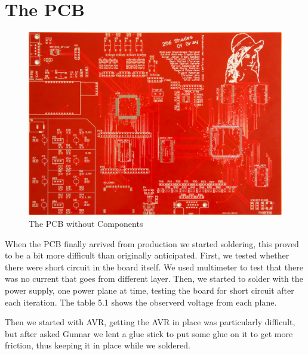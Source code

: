 \section {The PCB}
\begin{figure}[h]
  \centering
  \includegraphics[width=\textwidth]{fig/pcb/pcbwithoutcomp}
  \caption{The PCB without Components}
  \label{fig:pcb}
\end{figure}
When the PCB finally arrived from production we started soldering, this proved to be a bit
more difficult than originally anticipated. First, we tested whether there were short circuit in the board itself. We used multimeter to test that there was no current that goes from different layer. Then, we started to solder with the power supply, one power plane at time, testing the board for short circuit after each iteration. The table 5.1 shows the observerd voltage from each plane. 


Then we started with AVR, getting the AVR in place was particularly difficult, but after asked Gunnar we lent a glue stick to put some glue on it to get more friction, thus keeping it in place while we soldered.

